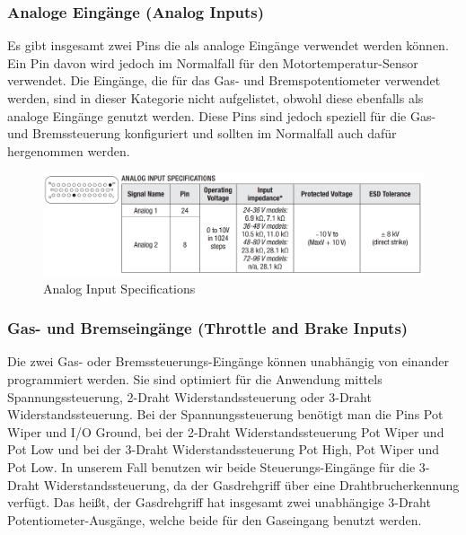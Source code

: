 \subsubsection{Analoge Eingänge (Analog Inputs)}
Es gibt insgesamt zwei Pins die als analoge Eingänge verwendet werden können. Ein Pin davon wird jedoch im Normalfall für den Motortemperatur-Sensor verwendet. Die Eingänge, die für das Gas- und Bremspotentiometer verwendet werden, sind in dieser Kategorie nicht aufgelistet, obwohl diese ebenfalls als analoge Eingänge genutzt werden. Diese Pins sind jedoch speziell für die Gas- und Bremssteuerung konfiguriert und sollten im Normalfall auch dafür hergenommen werden.

\begin{figure}[H]
	\begin{center}
		\includegraphics[width=\textwidth]{figures/antrieb/Analog_Input_Specifications.png}
		\caption{Analog Input Specifications}
	\end{center}
\end{figure}



\newpage



\subsubsection{Gas- und Bremseingänge (Throttle and Brake Inputs)}
Die zwei Gas- oder Bremssteuerungs-Eingänge können unabhängig von einander programmiert werden. Sie sind optimiert für die Anwendung mittels Spannungssteuerung, 2-Draht Widerstandssteuerung oder 3-Draht Widerstandssteuerung. Bei der Spannungssteuerung benötigt man die Pins Pot Wiper und I/O Ground, bei der 2-Draht Widerstandssteuerung Pot Wiper und Pot Low und bei der 3-Draht Widerstandssteuerung Pot High, Pot Wiper und Pot Low. In unserem Fall benutzen wir beide Steuerungs-Eingänge für die 3-Draht Widerstandssteuerung, da der Gasdrehgriff über eine Drahtbrucherkennung verfügt. Das heißt, der Gasdrehgriff hat insgesamt zwei unabhängige 3-Draht Potentiometer-Ausgänge, welche beide für den Gaseingang benutzt werden.

